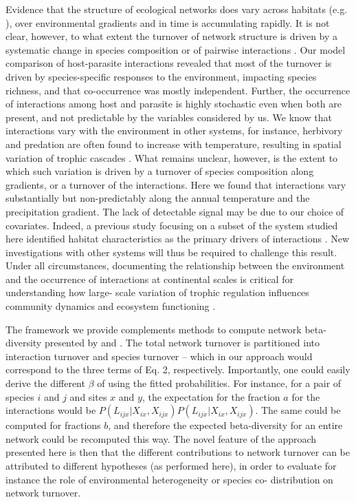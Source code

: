 \documentclass[12pt]{article}
\begin{document}
Evidence that the structure of ecological networks does vary across habitats
(e.g. \citealt{Tylianakis2007}), over environmental gradients
\citep{Lurgi2012} and in time \citep{Simanonok2014} is accumulating
rapidly. It is not clear, however, to what extent the turnover of network
structure is driven by a systematic change in species composition or of
pairwise interactions \citep{Poisot2012, Poisot2015a}. Our model comparison of
host-parasite interactions revealed that most of the turnover is driven by
species-specific responses to the environment, impacting species richness, and
that co-occurrence was mostly independent. Further, the occurrence of interactions
among host and parasite is highly stochastic even when both are present, and
not predictable by the variables considered by us. We know that interactions
vary with the environment in other systems, for instance, herbivory
\citep{Shurin2012, Baskett2018} and predation \citep{Mckinnon2010,
Legagneux2014} are often found to increase with temperature, resulting in
spatial variation of trophic cascades \citep{Gray2016}. What remains unclear,
however, is the extent to which such variation is driven by a turnover of
species composition along gradients, or a turnover of the interactions. Here
we found that interactions vary substantially but non-predictably along the
annual temperature and the precipitation gradient. The lack of detectable
signal may be due to our choice of covariates. Indeed, a previous study focusing on a subset of the system studied here identified habitat characteristics as the primary drivers of
interactions \citep{Nyman2015}. New investigations with other systems will
thus be required to challenge this result. Under all circumstances,
documenting the relationship between the environment and the occurrence of
interactions at continental scales is critical for understanding how large-
scale variation of trophic regulation influences community dynamics and
ecosystem functioning \citep{Harfoot2014}.

The framework we provide complements methods to compute network beta-diversity
presented by \citealt{Poisot2012} and \citealt{Poisot2018}. The total network
turnover is partitioned into interaction turnover and species turnover – which
in our approach would correspond to the three terms of Eq. 2, respectively.
Importantly, one could easily derive the different $\beta$ of
\citealt{Poisot2012} using the fitted probabilities. For instance, for a pair
of species $i$ and $j$ and sites $x$ and $y$, the expectation for the fraction
$a$ for the interactions would be
$P(L_{ijx}\lvert X_{ix},X_{ijx})P(L_{ijx}\lvert X_{ix},X_{ijx})$. The same could be
computed for fractions $b$, and therefore the expected beta-diversity for an
entire network could be recomputed this way. The novel feature of the approach
presented here is then that the different contributions to network turnover
can be attributed to different hypotheses (as performed here), in order to
evaluate for instance the role of environmental heterogeneity or species co-
distribution on network turnover.
\end{document}
